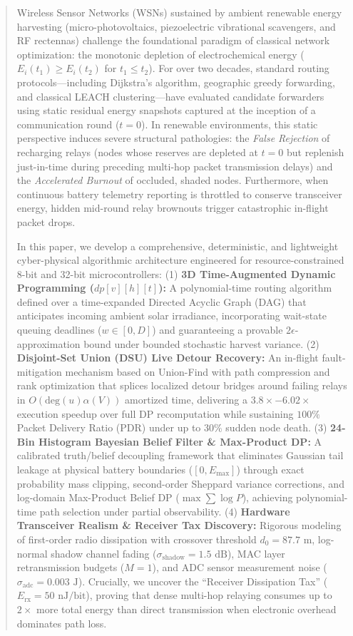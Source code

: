 \documentclass[journal]{IEEEtran}
\begin{document}
\begin{abstract}
Wireless Sensor Networks (WSNs) sustained by ambient renewable energy harvesting (micro-photovoltaics, piezoelectric vibrational scavengers, and RF rectennas) challenge the foundational paradigm of classical network optimization: the monotonic depletion of electrochemical energy ($E_i(t_1) \ge E_i(t_2)$ for $t_1 \le t_2$). For over two decades, standard routing protocols---including Dijkstra's algorithm, geographic greedy forwarding, and classical LEACH clustering---have evaluated candidate forwarders using static residual energy snapshots captured at the inception of a communication round ($t=0$). In renewable environments, this static perspective induces severe structural pathologies: the \textit{False Rejection} of recharging relays (nodes whose reserves are depleted at $t=0$ but replenish just-in-time during preceding multi-hop packet transmission delays) and the \textit{Accelerated Burnout} of occluded, shaded nodes. Furthermore, when continuous battery telemetry reporting is throttled to conserve transceiver energy, hidden mid-round relay brownouts trigger catastrophic in-flight packet drops.

In this paper, we develop a comprehensive, deterministic, and lightweight cyber-physical algorithmic architecture engineered for resource-constrained 8-bit and 32-bit microcontrollers:
(1) \textbf{3D Time-Augmented Dynamic Programming ($dp[v][h][t]$):} A polynomial-time routing algorithm defined over a time-expanded Directed Acyclic Graph (DAG) that anticipates incoming ambient solar irradiance, incorporating wait-state queuing deadlines ($w \in [0, D]$) and guaranteeing a provable $2\epsilon$-approximation bound under bounded stochastic harvest variance.
(2) \textbf{Disjoint-Set Union (DSU) Live Detour Recovery:} An in-flight fault-mitigation mechanism based on Union-Find with path compression and rank optimization that splices localized detour bridges around failing relays in $O(\text{deg}(u)\alpha(V))$ amortized time, delivering a $3.8\times - 6.02\times$ execution speedup over full DP recomputation while sustaining $100\%$ Packet Delivery Ratio (PDR) under up to $30\%$ sudden node death.
(3) \textbf{24-Bin Histogram Bayesian Belief Filter \& Max-Product DP:} A calibrated truth/belief decoupling framework that eliminates Gaussian tail leakage at physical battery boundaries ($[0, E_{\max}]$) through exact probability mass clipping, second-order Sheppard variance corrections, and log-domain Max-Product Belief DP ($\max \sum \log P$), achieving polynomial-time path selection under partial observability.
(4) \textbf{Hardware Transceiver Realism \& Receiver Tax Discovery:} Rigorous modeling of first-order radio dissipation with crossover threshold $d_0 = 87.7\text{ m}$, log-normal shadow channel fading ($\sigma_{\text{shadow}} = 1.5\text{ dB}$), MAC layer retransmission budgets ($M=1$), and ADC sensor measurement noise ($\sigma_{\text{adc}} = 0.003\text{ J}$). Crucially, we uncover the ``Receiver Dissipation Tax'' ($E_{\text{rx}} = 50\text{ nJ/bit}$), proving that dense multi-hop relaying consumes up to $2\times$ more total energy than direct transmission when electronic overhead dominates path loss.


\end{abstract}
\end{document}
